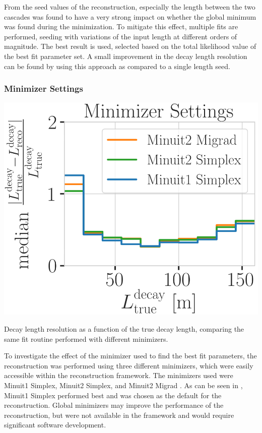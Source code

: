 From the seed values of the reconstruction, especially the length between the two cascades was found to have a very strong impact on whether the global minimum was found during the minimization. To mitigate this effect, multiple fits are performed, seeding with variations of the input length at different orders of magnitude. The best result is used, selected based on the total likelihood value of the best fit parameter set. A small improvement in the decay length resolution can be found by using this approach as compared to a single length seed.


\subsubsection{Minimizer Settings}

\begin{marginfigure}
	\centering
    \includegraphics{figures/results/190605_reco_optimization/minimizer_checks_median_decay_length_resolution_Good + L7 + reco E1,E2 above 3_fix_y_new.png}
    \caption[Decay length resolution to optimize minimizer settings]{Decay length resolution as a function of the true decay length, comparing the same fit routine performed with different minimizers.}
\end{marginfigure}

To investigate the effect of the minimizer used to find the best fit parameters, the reconstruction was performed using three different minimizers, which were easily accessible within the reconstruction framework. The minimizers used were Minuit1 Simplex, Minuit2 Simplex, and Minuit2 Migrad . As can be seen in , Minuit1 Simplex performed best and was chosen as the default for the reconstruction. Global minimizers may improve the performance of the reconstruction, but were not available in the framework and would require significant software development.


